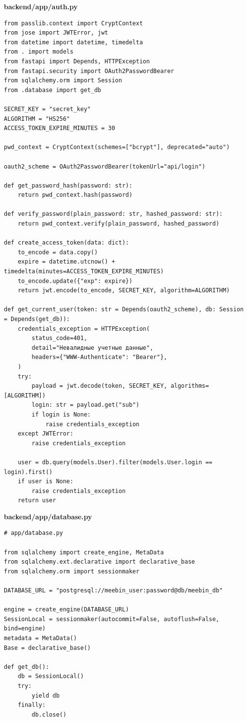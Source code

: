 \documentclass[coursework]{SCWorks}
\begin{document}
\begin{center}
\textbf{backend/app/auth.py}
\end{center}

\begin{verbatim}
from passlib.context import CryptContext
from jose import JWTError, jwt
from datetime import datetime, timedelta
from . import models
from fastapi import Depends, HTTPException
from fastapi.security import OAuth2PasswordBearer
from sqlalchemy.orm import Session
from .database import get_db

SECRET_KEY = "secret_key"
ALGORITHM = "HS256"
ACCESS_TOKEN_EXPIRE_MINUTES = 30

pwd_context = CryptContext(schemes=["bcrypt"], deprecated="auto")

oauth2_scheme = OAuth2PasswordBearer(tokenUrl="api/login")

def get_password_hash(password: str):
    return pwd_context.hash(password)

def verify_password(plain_password: str, hashed_password: str):
    return pwd_context.verify(plain_password, hashed_password)

def create_access_token(data: dict):
    to_encode = data.copy()
    expire = datetime.utcnow() + timedelta(minutes=ACCESS_TOKEN_EXPIRE_MINUTES)
    to_encode.update({"exp": expire})
    return jwt.encode(to_encode, SECRET_KEY, algorithm=ALGORITHM)

def get_current_user(token: str = Depends(oauth2_scheme), db: Session = Depends(get_db)):
    credentials_exception = HTTPException(
        status_code=401,
        detail="Невалидные учетные данные",
        headers={"WWW-Authenticate": "Bearer"},
    )
    try:
        payload = jwt.decode(token, SECRET_KEY, algorithms=[ALGORITHM])
        login: str = payload.get("sub")
        if login is None:
            raise credentials_exception
    except JWTError:
        raise credentials_exception
    
    user = db.query(models.User).filter(models.User.login == login).first()
    if user is None:
        raise credentials_exception
    return user
\end{verbatim}

\begin{center}
\textbf{backend/app/database.py}
\end{center}

\begin{verbatim}
# app/database.py

from sqlalchemy import create_engine, MetaData
from sqlalchemy.ext.declarative import declarative_base
from sqlalchemy.orm import sessionmaker

DATABASE_URL = "postgresql://meebin_user:password@db/meebin_db"

engine = create_engine(DATABASE_URL)
SessionLocal = sessionmaker(autocommit=False, autoflush=False, bind=engine)
metadata = MetaData()
Base = declarative_base()

def get_db():
    db = SessionLocal()
    try:
        yield db
    finally:
        db.close()
\end{verbatim}
\end{document}
